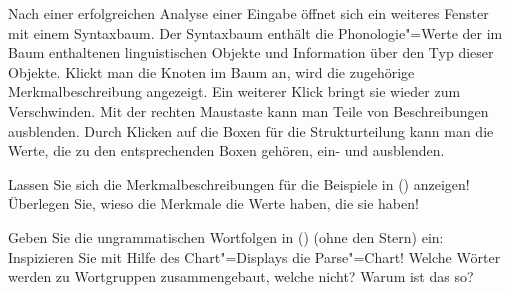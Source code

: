 {\begin{enumerate}
      Nach einer erfolgreichen Analyse einer Eingabe öffnet sich ein weiteres Fenster mit einem
      Syntaxbaum. Der Syntaxbaum enthält die Phonologie"=Werte der im Baum enthaltenen
      linguistischen Objekte und Information über den Typ dieser Objekte.
      Klickt man die Knoten im Baum an, wird die zugehörige Merkmalbeschreibung
      angezeigt. Ein weiterer Klick bringt sie wieder zum Verschwinden. Mit der rechten Maustaste
      kann man Teile von Beschreibungen ausblenden. Durch Klicken auf die Boxen für die Strukturteilung
      kann man die Werte, die zu den entsprechenden Boxen gehören, ein- und ausblenden.

      Lassen Sie sich die Merkmalbeschreibungen für die Beispiele in () anzeigen!
      Überlegen Sie, wieso die Merkmale die Werte haben, die sie haben!
      
      Geben Sie die ungrammatischen Wortfolgen in () (ohne den Stern) ein:
      \eal
      \zl
      Inspizieren Sie mit Hilfe des Chart"=Displays die Parse"=Chart! Welche Wörter
      werden zu Wortgruppen zusammengebaut, welche nicht? Warum ist das so?
\end{enumerate}
}
